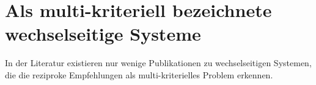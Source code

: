 \section{Als multi-kriteriell bezeichnete wechselseitige Systeme}



In der Literatur existieren nur wenige Publikationen zu wechselseitigen Systemen, die die reziproke Empfehlungen als multi-kriterielles Problem erkennen.

